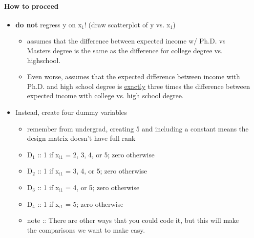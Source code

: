 \paragraph{How to proceed}
\begin{itemize}
\item \textbf{do not} regress y on x$_1$! (draw scatterplot of y vs. x$_1$)
\begin{itemize}
\item assumes that the difference between expected income w/
          Ph.D. vs Masters degree is the same as the difference for
          college degree vs. highschool.
\item Even worse, assumes that the expected difference between
          income with Ph.D. and high school degree is \underline{exactly} three
          times the difference between expected income with college
          vs. high school degree.
\end{itemize}
\item Instead, create four dummy variables
\begin{itemize}
\item remember from undergrad, creating 5 and including a constant
          means the design matrix doesn't have full rank
\item D$_1$ :: 1 if x$_{\mathrm{i1}}$ = 2, 3, 4, or 5; zero otherwise
\item D$_2$ :: 1 if x$_{\mathrm{i1}}$ = 3, 4, or 5; zero otherwise
\item D$_3$ :: 1 if x$_{\mathrm{i1}}$ = 4, or 5; zero otherwise
\item D$_4$ :: 1 if x$_{\mathrm{i1}}$ = 5; zero otherwise
\item note :: There are other ways that you could code it, but
                  this will make the comparisons we want to make easy.
\end{itemize}
\end{itemize}

